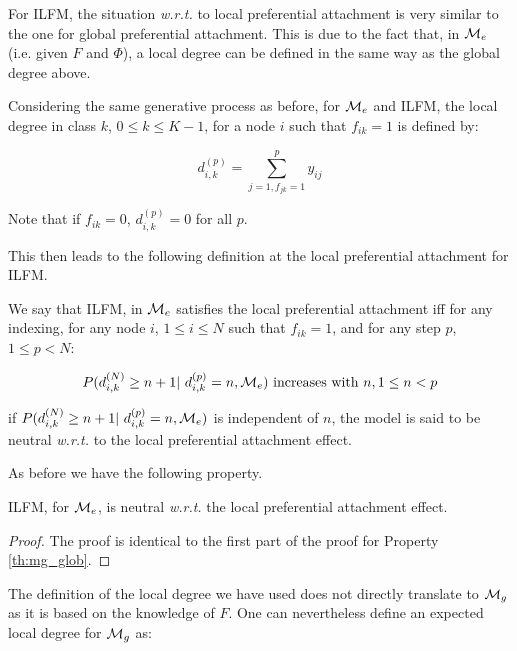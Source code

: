 For ILFM, the situation \textit{w.r.t.} to local preferential attachment is very similar to the one for global preferential attachment.
This is due to the fact that, in $\mathcal{M}_e$ (i.e. given $F$ and $\Phi$), a local degree can be defined in the same way as the global degree above.

Considering the same generative process as before, for $\mathcal{M}_e$ and ILFM, the local degree in class $k$, $0\leq k\leq K-1$, for a node $i$ such that $f_{ik}=1$ is defined by:

\begin{equation*}
d_{i,k}^{(p)} = \sum_{j=1, f_{jk}=1}^p y_{ij}
\end{equation*}

Note that if $f_{ik}=0$, $d_{i,k}^{(p)} = 0$ for all $p$.

This then leads to the following definition at the local preferential attachment for ILFM.

\begin{definition}

We say that ILFM, in $\mathcal{M}_e$ satisfies the local preferential attachment iff for any indexing, for any node $i$, $1\leq i \leq N$ such that $f_{ik}=1$, and for any step $p$, $1\leq p < N$:

\begin{equation*}
P(d_{i,k}^{(N)} \geq n+1 | d_{i,k}^{(p)}=n,\M_e) \textrm{ increases with } n , 1\leq n < p
\end{equation*}

if $P(d_{i,k}^{(N)} \geq n+1 | d_{i,k}^{(p)}=n,\M_e)$ is independent of $n$, the model is said to be neutral \textit{w.r.t.} to the local preferential attachment effect.

\end{definition}
As before we have the following property.

\begin{proposition}
ILFM, for $\mathcal{M}_e$, is neutral \textit{w.r.t.} the local preferential attachment effect.
\end{proposition}

\begin{proof}
The proof is identical to the first part of the proof for Property \ref{th:mg_glob}.
\end{proof}

The definition of the local degree we have used does not directly translate to $\mathcal{M}_g$ as it is based on the knowledge of $F$. One can nevertheless define an expected local degree for $\mathcal{M}_g$ as:

